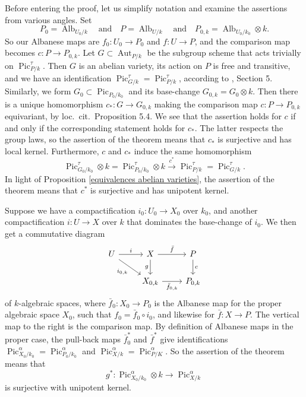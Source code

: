 \documentclass[oneside, 12pt]{amsart}
\theoremstyle{definition}
\theoremstyle{remark}
\newcommand{\Alb}{\operatorname{Alb}}
\newcommand{\Aut}{\operatorname{Aut}}
\newcommand{\lra}{\longrightarrow}
\newcommand{\Pic}{\operatorname{Pic}}
\newcommand{\quadand}{\quad\text{and}\quad}
\newcommand{\ra}{\rightarrow}
\newcommand{\baf}{\bar{f}}
\begin{document}
Before entering the  proof, let us simplify notation and examine the assertions from various angles.
Set 
$$
P_0=\Alb_{U_0/k}\quadand P=\Alb_{U/k} \quadand  P_{0,k}=\Alb_{U_0/k_0}\otimes k.
$$
So our  Albanese maps are $f_0:U_0\ra P_0$ and $f:U\ra P$, and the   comparison map becomes $c:P\ra P_{0,k}$.  
Let $G\subset\Aut_{P/k}$ be the subgroup scheme that acts trivially on  $\Pic^\tau_{P/k}$.
Then $G$ is an abelian variety, its action on $P$ is free and transitive, and we have an identification $\Pic^\tau_{G/k}=\Pic^\tau_{P/k}$,
according to \cite{Laurent; Schroeer 2021}, Section 5. Similarly, we form $G_0\subset \Pic_{P_0/k_0}$ and its base-change $G_{0,k}=G_0\otimes k$. Then
there is a unique homomorphism $c_*:G\ra G_{0,k}$ making the comparison map $c:P\ra P_{0,k}$ equivariant, by loc.\ cit.\  Proposition 5.4.
We see that the assertion holds for $c$   if and only if the corresponding statement holds for $c_*$.
The latter respects the group laws,  so the assertion of the theorem means that  $c_*$ is surjective and  has local kernel.
Furthermore, $c $ and $c_*$  induce the same homomorphism  
$$
\Pic^\tau_{G_0/k_0}\otimes k=\Pic^\tau_{P_0/k_0}\otimes k
\stackrel{c^*}{\lra}
\Pic^\tau_{P/k}=\Pic^\tau_{G/k}.
$$
In light of Proposition \ref{equivalences abelian varieties}, the assertion of the theorem means that  $c^*$ is surjective and has unipotent kernel.

Suppose we have a compactification   $i_0:U_0\ra X_0$ over $k_0$, and another compactification  $i:U\ra X$ over $k$ that
dominates the base-change of $i_0$. We then get a commutative diagram 
\begin{equation}
\label{diagram compactification}
\begin{tikzcd} 
U\ar[r,"i"]\ar[rd,"i_{0,k}"']	& X\ar[r,"\baf"]\ar[d,"g"']		& P\ar[d,"c"]\\
			& X_{0,k}\ar[r,"\baf_{0,k}"']	& P_{0,k}
\end{tikzcd}
\end{equation}
of $k$-algebraic spaces,  where   $\baf_0:X_0\ra P_0$ is the Albanese map for the proper algebraic space $X_0$, such that
$f_0=\baf_0\circ i_0$, and likewise for  $\baf:X\ra P$.
The vertical map to the right is the comparison map.
By definition of Albanese maps in the proper case, the pull-back maps $\baf^*_0$ and $\baf^*$ give identifications 
$\Pic^\alpha_{X_0/k_0}=\Pic^\alpha_{P_0/k_0}$ and $ \Pic^\alpha_{X/k}=\Pic^\alpha_{P/K}$. So the assertion of the theorem means that
\begin{equation}
\label{induced map on picard}
g^*:\Pic^\alpha_{X_0/k_0}\otimes k\lra \Pic^\alpha_{X/k}
\end{equation}
is  surjective  with unipotent kernel.
\end{document}
